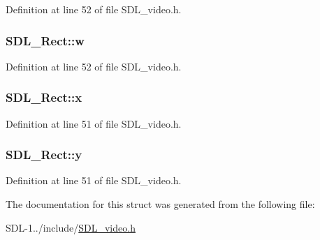 Definition at line 52 of file S\+D\+L\+\_\+video.\+h.

\hypertarget{struct_s_d_l___rect_a1b56ba7422035ca0dc31f052638a7042}{}
\subsubsection[{w}]{ S\+D\+L\+\_\+\+Rect\+::w}\label{struct_s_d_l___rect_a1b56ba7422035ca0dc31f052638a7042}


Definition at line 52 of file S\+D\+L\+\_\+video.\+h.

\hypertarget{struct_s_d_l___rect_a7a358b2006a14a40c0d52e5940d92c23}{}
\subsubsection[{x}]{ S\+D\+L\+\_\+\+Rect\+::x}\label{struct_s_d_l___rect_a7a358b2006a14a40c0d52e5940d92c23}


Definition at line 51 of file S\+D\+L\+\_\+video.\+h.

\hypertarget{struct_s_d_l___rect_a4d55e2006d059c2060f0a54ce4ce553d}{}
\subsubsection[{y}]{ S\+D\+L\+\_\+\+Rect\+::y}\label{struct_s_d_l___rect_a4d55e2006d059c2060f0a54ce4ce553d}


Definition at line 51 of file S\+D\+L\+\_\+video.\+h.



The documentation for this struct was generated from the following file\+:\begin{DoxyCompactItemize}
\item 
S\+D\+L-\/1../include/\hyperlink{_s_d_l__video_8h}{S\+D\+L\+\_\+video.\+h}\end{DoxyCompactItemize}
